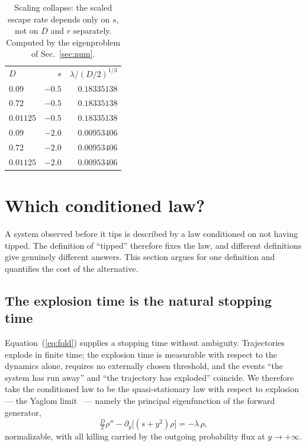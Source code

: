 \documentclass[%
 aip,
 cha,
 amsmath,amssymb,
 reprint,
 superscriptaddress,
 floatfix,
]{revtex4-2}
\begin{document}
\begin{table}[b]
\caption{\label{tab:collapse}%
Scaling collapse: the scaled escape rate depends only on $s$, not on $D$ and $r$ separately.  Computed by the eigenproblem of Sec.~\ref{sec:num}.}
\begin{ruledtabular}
\begin{tabular}{lrr}
$D$ & $s$ & $\lambda/(D/2)^{1/3}$ \\
\colrule
$0.09$    & $-0.5$ & $0.18335138$ \\
$0.72$    & $-0.5$ & $0.18335138$ \\
$0.01125$ & $-0.5$ & $0.18335138$ \\
$0.09$    & $-2.0$ & $0.00953406$ \\
$0.72$    & $-2.0$ & $0.00953406$ \\
$0.01125$ & $-2.0$ & $0.00953406$ \\
\end{tabular}
\end{ruledtabular}
\end{table}

\section{\label{sec:law}Which conditioned law?}

A system observed before it tips is described by a law conditioned on not having tipped.  The definition of ``tipped'' therefore fixes the law, and different definitions give genuinely different answers.  This section argues for one definition and quantifies the cost of the alternative.

\subsection{The explosion time is the natural stopping time}

Equation~(\ref{eq:fold}) supplies a stopping time without ambiguity.  Trajectories explode in finite time; the explosion time is measurable with respect to the dynamics alone, requires no externally chosen threshold, and the events ``the system has run away'' and ``the trajectory has exploded'' coincide.  We therefore take the conditioned law to be the quasi-stationary law with respect to explosion --- the Yaglom limit~\cite{MeleardVillemonais2012,Collet2013} --- namely the principal eigenfunction of the forward generator,
\begin{equation}
\label{eq:killed}
\tfrac D2\rho''-\partial_y\bigl[(s+y^2)\rho\bigr]=-\lambda\,\rho ,
\end{equation}
normalizable, with all killing carried by the outgoing probability flux at $y\to+\infty$.
\end{document}

